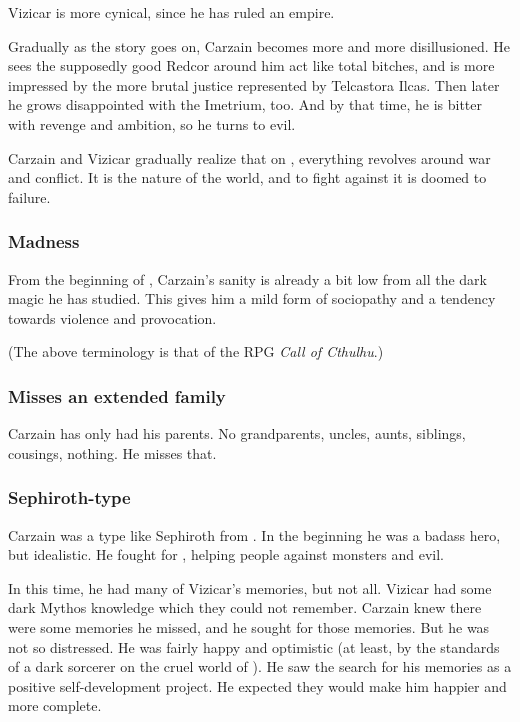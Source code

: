 Vizicar is more cynical, since he has ruled an empire. 

Gradually as the story goes on, Carzain becomes more and more disillusioned. He sees the supposedly good Redcor around him act like total bitches, and is more impressed by the more brutal justice represented by Telcastora Ilcas. Then later he grows disappointed with the Imetrium, too. And by that time, he is bitter with revenge and ambition, so he turns to evil. 

Carzain and Vizicar gradually realize that on \Miith{}, everything revolves around war and conflict. It is the nature of the world, and to fight against it is doomed to failure. 





\subsubsection{Madness}
From the beginning of \emph{\TwilightAngelRemember{}}, Carzain's sanity is already a bit low from all the dark \nieur{} magic he has studied. 
This gives him a mild form of sociopathy and a tendency towards violence and provocation. 

(The above terminology is that of the RPG \emph{Call of Cthulhu}.)





\subsubsection{Misses an extended family}
Carzain has only had his parents. 
No grandparents, uncles, aunts, siblings, cousings, nothing. 
He misses that. 





\subsubsection{Sephiroth-type}
Carzain was a type like Sephiroth from \cite{VideoGame:FinalFantasyVII}. 
In the beginning he was a badass hero, but idealistic.
He fought for , helping people against monsters and evil. 

In this time, he had many of Vizicar's memories, but not all. 
Vizicar had some dark Mythos knowledge which they could not remember. 
Carzain knew there were some memories he missed, and he sought for those memories. 
But he was not so distressed. 
He was fairly happy and optimistic (at least, by the standards of a dark sorcerer on the cruel world of \Miith). 
He saw the search for his memories as a positive self-development project. 
He expected they would make him happier and more complete. 

